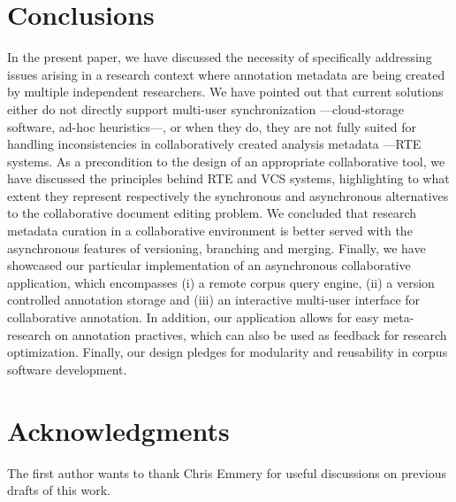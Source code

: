 \documentclass{sig-alternate}
\begin{document}
\section{Conclusions}\label{sec:conclusion}
In the present paper, we have discussed the necessity of specifically addressing issues arising
in a research context where annotation metadata are being created by multiple independent researchers.
We have pointed out that current solutions either do not directly support multi-user
synchronization ---cloud-storage software, ad-hoc heuristics---, or when they do, they are not fully
suited for handling inconsistencies in collaboratively created analysis metadata ---RTE systems.
As a precondition to the design of an appropriate collaborative tool, we have discussed the
principles behind RTE and VCS systems, highlighting to what extent they represent respectively
the synchronous and asynchronous alternatives to the collaborative document editing problem.
We concluded that research metadata curation in a collaborative environment is better served with
the asynchronous features of versioning, branching and merging.
Finally, we have showcased our particular implementation of an asynchronous collaborative application,
which encompasses (i) a remote corpus query engine, (ii) a version controlled annotation storage
and (iii) an interactive multi-user interface for collaborative annotation.
In addition, our application allows for easy meta-research on annotation practives, which can
also be used as feedback for research optimization.
Finally, our design pledges for modularity and reusability in corpus software development.

\section{Acknowledgments}
The first author wants to thank Chris Emmery for useful discussions on previous drafts of this work. 



%
%

\end{document}
